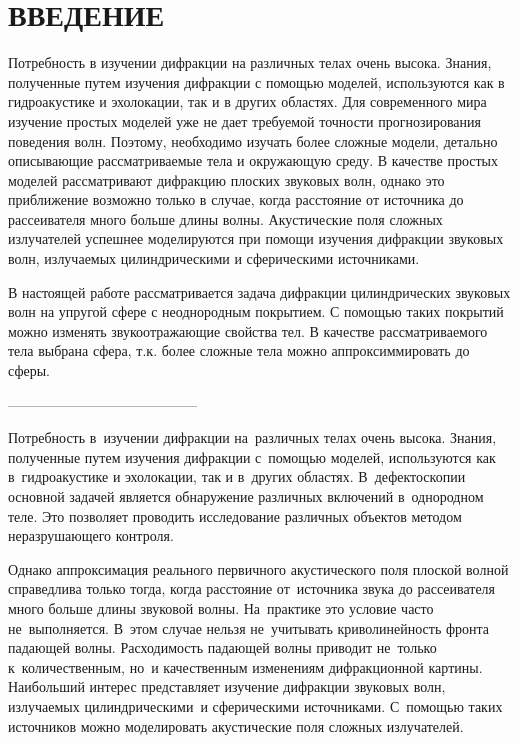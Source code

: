 

\renewcommand{\bibname}{СПИСОК ИСПОЛЬЗОВАННЫХ ИСТОЧНИКОВ}
\renewcommand\refname{СПИСОК ИСПОЛЬЗОВАННЫХ ИСТОЧНИКОВ}

%

\setcounter{page}{2}
\thispagestyle {empty}
\renewcommand{\contentsname}{\centering СОДЕРЖАНИЕ}
\tableofcontents

\newpage
\section*{ВВЕДЕНИЕ}


Потребность в изучении дифракции на различных телах очень высока. Знания, полученные путем изучения дифракции с помощью моделей, используются как в гидроакустике и эхолокации, так и в других областях. Для современного мира изучение простых моделей уже не дает требуемой точности прогнозирования поведения волн. Поэтому, необходимо изучать более сложные модели, детально описывающие рассматриваемые тела и окружающую среду.
В качестве простых моделей рассматривают дифракцию плоских звуковых волн, однако это приближение возможно только в случае, когда расстояние от источника до рассеивателя много больше длины волны. Акустические поля сложных излучателей успешнее моделируются при помощи изучения дифракции звуковых волн, излучаемых цилиндрическими и сферическими источниками.

В настоящей работе рассматривается задача дифракции цилиндрических звуковых волн на упругой сфере с неоднородным покрытием. С помощью таких покрытий можно изменять звукоотражающие свойства тел. В качестве рассматриваемого тела выбрана сфера, т.к. более сложные тела можно аппроксиммировать до сферы. 

-----------------------------------------

Потребность в~изучении дифракции на~различных телах очень высока. Знания, полученные путем изучения дифракции с~помощью моделей, используются как в~гидроакустике и эхолокации, так и в~других областях. В~дефектоскопии основной задачей является обнаружение различных включений в~однородном теле. Это позволяет проводить исследование различных объектов методом неразрушающего контроля.

Однако аппроксимация реального первичного акустического поля
плоской волной справедлива только тогда, когда расстояние от~источника звука до рассеивателя много больше длины звуковой волны. На~практике это условие часто не~выполняется. В~этом случае нельзя не~учитывать криволинейность фронта падающей волны. Расходимость падающей волны приводит не~только к~количественным, но~и качественным изменениям дифракционной картины. Наибольший интерес представляет изучение дифракции звуковых волн, излучаемых цилиндрическими~и
сферическими источниками. С~помощью таких источников можно моделировать акустические поля сложных излучателей.


